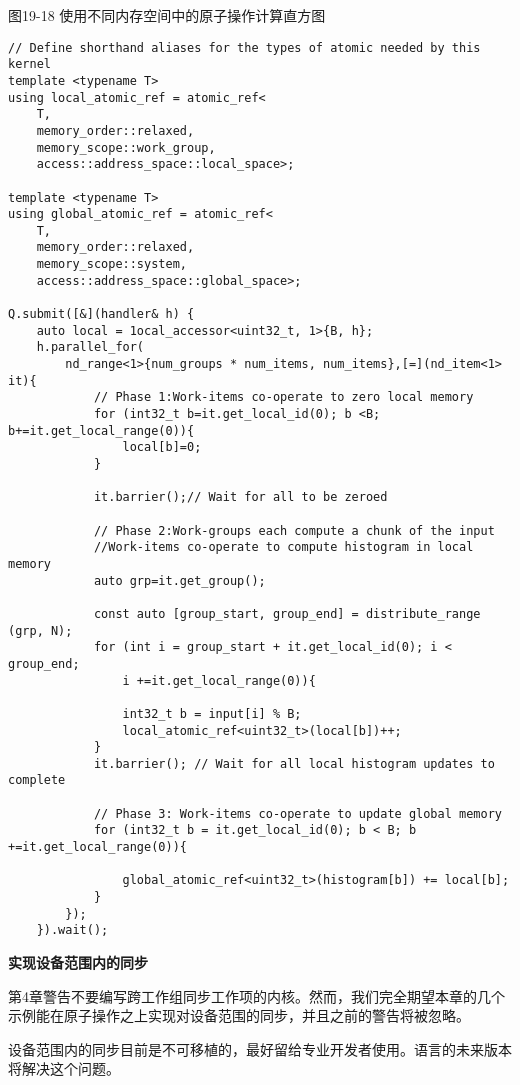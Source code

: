 \hspace*{\fill} \par %
图19-18 使用不同内存空间中的原子操作计算直方图
\begin{lstlisting}[caption={}]
// Define shorthand aliases for the types of atomic needed by this kernel 
template <typename T>
using local_atomic_ref = atomic_ref<
	T,
	memory_order::relaxed, 
	memory_scope::work_group,
	access::address_space::local_space>; 
	
template <typename T>
using global_atomic_ref = atomic_ref<
	T,
	memory_order::relaxed, 
	memory_scope::system,
	access::address_space::global_space>; 
	
Q.submit([&](handler& h) {
	auto local = 1ocal_accessor<uint32_t, 1>{B, h};
	h.parallel_for(
		nd_range<1>{num_groups * num_items, num_items},[=](nd_item<1> it){ 
			// Phase 1:Work-items co-operate to zero local memory
			for (int32_t b=it.get_local_id(0); b <B; b+=it.get_local_range(0)){
				local[b]=0;
			}
		
			it.barrier();// Wait for all to be zeroed
		
			// Phase 2:Work-groups each compute a chunk of the input 
			//Work-items co-operate to compute histogram in local memory 
			auto grp=it.get_group();
		
			const auto [group_start, group_end] = distribute_range (grp, N); 
			for (int i = group_start + it.get_local_id(0); i < group_end; 
				i +=it.get_local_range(0)){
			
				int32_t b = input[i] % B;
				local_atomic_ref<uint32_t>(local[b])++;
			}
			it.barrier(); // Wait for all local histogram updates to complete 
			
			// Phase 3: Work-items co-operate to update global memory
			for (int32_t b = it.get_local_id(0); b < B; b +=it.get_local_range(0)){
				
				global_atomic_ref<uint32_t>(histogram[b]) += local[b];
			}
		});
	}).wait();
\end{lstlisting}

\hspace*{\fill} \par %
\textbf{实现设备范围内的同步}

第4章警告不要编写跨工作组同步工作项的内核。然而，我们完全期望本章的几个示例能在原子操作之上实现对设备范围的同步，并且之前的警告将被忽略。\par

\begin{tcolorbox}[colback=red!5!white,colframe=red!75!black]
设备范围内的同步目前是不可移植的，最好留给专业开发者使用。语言的未来版本将解决这个问题。
\end{tcolorbox}

